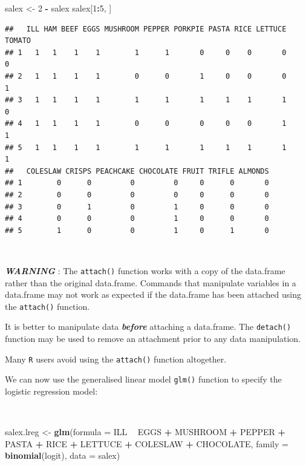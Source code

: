 \documentclass[12pt,a4paper]{book}
\newenvironment{Shaded}{\begin{snugshade}}{\end{snugshade}}
\newcommand{\KeywordTok}[1]{\textcolor[rgb]{0.13,0.29,0.53}{\textbf{#1}}}
\newcommand{\DataTypeTok}[1]{\textcolor[rgb]{0.13,0.29,0.53}{#1}}
\newcommand{\DecValTok}[1]{\textcolor[rgb]{0.00,0.00,0.81}{#1}}
\newcommand{\StringTok}[1]{\textcolor[rgb]{0.31,0.60,0.02}{#1}}
\newcommand{\OperatorTok}[1]{\textcolor[rgb]{0.81,0.36,0.00}{\textbf{#1}}}
\newcommand{\NormalTok}[1]{#1}
\theoremstyle{definition}
\theoremstyle{definition}
\theoremstyle{definition}
\theoremstyle{remark}
\begin{document}
\begin{Shaded}
\begin{Highlighting}[]
\NormalTok{salex <-}\StringTok{ }\DecValTok{2} \OperatorTok{-}\StringTok{ }\NormalTok{salex}
\NormalTok{salex[}\DecValTok{1}\OperatorTok{:}\DecValTok{5}\NormalTok{, ]}
\end{Highlighting}
\end{Shaded}

\begin{verbatim}
##   ILL HAM BEEF EGGS MUSHROOM PEPPER PORKPIE PASTA RICE LETTUCE TOMATO
## 1   1   1    1    1        1      1       0     0    0       0      0
## 2   1   1    1    1        0      0       1     0    0       0      1
## 3   1   1    1    1        1      1       1     1    1       1      0
## 4   1   1    1    1        0      0       0     0    0       1      1
## 5   1   1    1    1        1      1       1     1    1       1      1
##   COLESLAW CRISPS PEACHCAKE CHOCOLATE FRUIT TRIFLE ALMONDS
## 1        0      0         0         0     0      0       0
## 2        0      0         0         0     0      0       0
## 3        0      1         0         1     0      0       0
## 4        0      0         0         1     0      0       0
## 5        1      0         0         1     0      1       0
\end{verbatim}

~

\textbf{\emph{WARNING}} : The \texttt{attach()} function works with a
copy of the data.frame rather than the original data.frame. Commands
that manipulate variables in a data.frame may not work as expected if
the data.frame has been attached using the \texttt{attach()} function.

It is better to manipulate data \textbf{\emph{before}} attaching a
data.frame. The \texttt{detach()} function may be used to remove an
attachment prior to any data manipulation.

Many \texttt{R} users avoid using the \texttt{attach()} function
altogether.

We can now use the generalised linear model \texttt{glm()} function to
specify the logistic regression model:

~

\begin{Shaded}
\begin{Highlighting}[]
\NormalTok{salex.lreg <-}\StringTok{ }\KeywordTok{glm}\NormalTok{(}\DataTypeTok{formula =}\NormalTok{ ILL }\OperatorTok{~}\StringTok{ }\NormalTok{EGGS }\OperatorTok{+}\StringTok{ }\NormalTok{MUSHROOM }\OperatorTok{+}\StringTok{ }\NormalTok{PEPPER }\OperatorTok{+}\StringTok{ }\NormalTok{PASTA }\OperatorTok{+}
\StringTok{                  }\NormalTok{RICE }\OperatorTok{+}\StringTok{ }\NormalTok{LETTUCE }\OperatorTok{+}\StringTok{ }\NormalTok{COLESLAW }\OperatorTok{+}\StringTok{ }\NormalTok{CHOCOLATE,}
                  \DataTypeTok{family =} \KeywordTok{binomial}\NormalTok{(logit), }\DataTypeTok{data =}\NormalTok{ salex)}
\end{Highlighting}
\end{Shaded}
\end{document}
